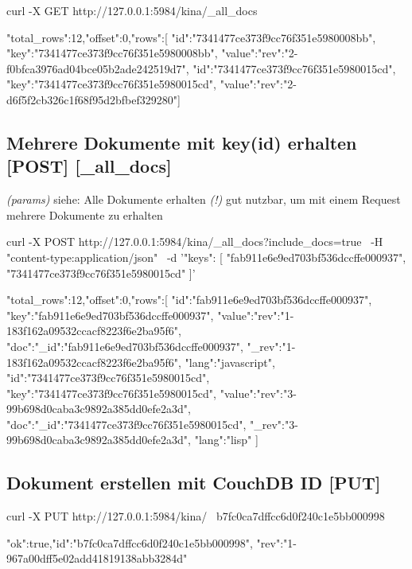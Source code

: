 \documentclass[19pt,landscape,twocolumn]{article}
\newcommand{\htmlverb}[1]{{[}\textbf{{#1}}{]}}
\newcommand{\setparskip}{\setlength{\parskip}{-6mm}}
\newcommand{\resetparskip}{\setlength{\parskip}{1mm}}
\begin{document}
\begin{code}
curl -X GET http://127.0.0.1:5984/kina/_all_docs
\end{code}
\setparskip
\begin{response}
{"total_rows":12,"offset":0,"rows":[
{"id":"7341477ce373f9cc76f351e5980008bb",
 "key":"7341477ce373f9cc76f351e5980008bb",
 "value":{"rev":"2-f0bfca3976ad04bce05b2ade242519d7"}},
{"id":"7341477ce373f9cc76f351e5980015cd",
 "key":"7341477ce373f9cc76f351e5980015cd",
 "value":{"rev":"2-d6f5f2cb326c1f68f95d2bfbef329280"}}]}
\end{response}
\resetparskip

\subsection{Mehrere Dokumente mit key(id) erhalten \htmlverb{POST} \htmlverb{\_all\_docs}}
\emph{(params)} siehe: Alle Dokumente erhalten \newline
\emph{(!)} gut nutzbar, um mit einem Request mehrere Dokumente zu erhalten

\begin{code}
curl -X POST http://127.0.0.1:5984/kina/_all_docs?include_docs=true \
  -H "content-type:application/json" \
  -d '{"keys": [
        "fab911e6e9ed703bf536dccffe000937",
        "7341477ce373f9cc76f351e5980015cd"
      ]}'
\end{code}
\setparskip
\begin{response}
{"total_rows":12,"offset":0,"rows":[
  {"id":"fab911e6e9ed703bf536dccffe000937",
   "key":"fab911e6e9ed703bf536dccffe000937",
   "value":{"rev":"1-183f162a09532ccacf8223f6e2ba95f6"},
   "doc":{"_id":"fab911e6e9ed703bf536dccffe000937",
   "_rev":"1-183f162a09532ccacf8223f6e2ba95f6",
   "lang":"javascript"}},
  {"id":"7341477ce373f9cc76f351e5980015cd",
   "key":"7341477ce373f9cc76f351e5980015cd",
   "value":{"rev":"3-99b698d0caba3c9892a385dd0efe2a3d"},
   "doc":{"_id":"7341477ce373f9cc76f351e5980015cd",
   "_rev":"3-99b698d0caba3c9892a385dd0efe2a3d",
   "lang":"lisp"}}
]}
\end{response}
\resetparskip

\subsection{Dokument erstellen mit CouchDB ID \htmlverb{PUT}}

\begin{code}
curl -X PUT http://127.0.0.1:5984/kina/ \
  b7fc0ca7dffcc6d0f240c1e5bb000998
\end{code}
\setparskip
\begin{response}
{"ok":true,"id":"b7fc0ca7dffcc6d0f240c1e5bb000998",
 "rev":"1-967a00dff5e02add41819138abb3284d"}
\end{response}
\resetparskip
\end{document}

